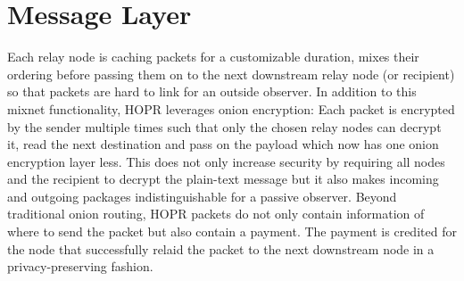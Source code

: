 \section{Message Layer} \label{MessageLayer}

Each relay node is caching packets for a customizable duration, mixes their ordering before passing them on to the next downstream relay node (or recipient) so that packets are hard to link for an outside observer. In addition to this mixnet functionality, HOPR leverages onion encryption: Each packet is encrypted by the sender multiple times such that only the chosen relay nodes can decrypt it, read the next destination and pass on the payload which now has one onion encryption layer less. This does not only increase security by requiring all nodes and the recipient to decrypt the plain-text message but it also makes incoming and outgoing packages indistinguishable for a passive observer. Beyond traditional onion routing, HOPR packets do not only contain information of where to send the packet but also contain a payment. The payment is credited for the node that successfully relaid the packet to the next downstream node in a privacy-preserving fashion.
